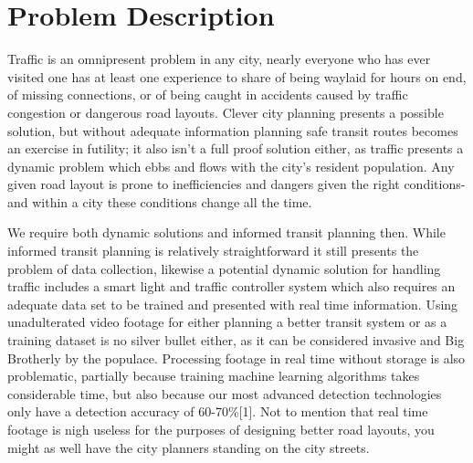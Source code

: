 \documentclass[letterpaper,10pt,draftclsnofoot,onecolumn]{IEEEtran}
\begin{document}
\section{Problem Description}
Traffic is an omnipresent problem in any city, nearly everyone who has ever visited one has at least one experience to share of being waylaid for hours on end, of missing connections, or of being caught in accidents caused by traffic congestion or dangerous road layouts. Clever city planning presents a possible solution, but without adequate information planning safe transit routes becomes an exercise in futility; it also isn’t a full proof solution either, as traffic presents a dynamic problem which ebbs and flows with the city’s resident population. Any given road layout is prone to inefficiencies and dangers given the right conditions- and within a city these conditions change all the time.\par
We require both dynamic solutions and informed transit planning then. While informed transit planning is relatively straightforward it still presents the problem of data collection, likewise a potential dynamic solution for handling traffic includes a smart light and traffic controller system which also requires an adequate data set to be trained and presented with real time information. Using unadulterated video footage for either planning a better transit system or as a training dataset is no silver bullet either, as it can be considered invasive and Big Brotherly by the populace. Processing footage in real time without storage is also problematic, partially because training machine learning algorithms takes considerable time, but also because our most advanced detection technologies only have a detection accuracy of 60-70\%[1]. Not to mention that real time footage is nigh useless for the purposes of designing better road layouts, you might as well have the city planners standing on the city streets.
\end{document}

